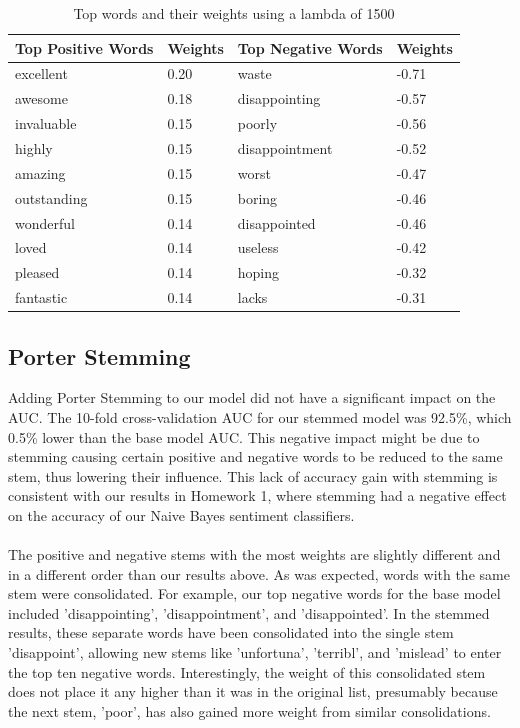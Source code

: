 \documentclass{article}
\begin{document}
\begin{table}[h]
    \begin{tabular}{|l|l|l|l|}
        \hline
        Top Positive Words & Weights & Top Negative Words & Weights \\ \hline
        excellent   & 0.20 & waste          & -0.71 \\ 
        awesome     & 0.18 & disappointing  & -0.57 \\ 
        invaluable  & 0.15 & poorly         & -0.56 \\ 
        highly      & 0.15 & disappointment & -0.52 \\ 
        amazing     & 0.15 & worst          & -0.47 \\ 
        outstanding & 0.15 & boring         & -0.46 \\ 
        wonderful   & 0.14 & disappointed   & -0.46 \\ 
        loved       & 0.14 & useless        & -0.42 \\ 
        pleased     & 0.14 & hoping         & -0.32 \\ 
        fantastic   & 0.14 & lacks          & -0.31 \\
        \hline
    \end{tabular}
    \caption{Top words and their weights using a lambda of 1500}
    \label{tab:words}
\end{table}


\subsection{Porter Stemming}

Adding Porter Stemming to our model did not have a significant impact on the AUC.  The 10-fold cross-validation AUC for our stemmed model was 92.5\%, which 0.5\% lower than the base model AUC. This negative impact might be due to stemming causing certain positive and negative words to be reduced to the same stem, thus lowering their influence. This lack of accuracy gain with stemming is consistent with our results in Homework 1, where stemming had a negative effect on the accuracy of our Naive Bayes sentiment classifiers.
\\\\The positive and negative stems with the most weights are slightly different and in a different order than our results above. As was expected, words with the same stem were consolidated. For example, our top negative words for the base model included 'disappointing', 'disappointment', and 'disappointed'. In the stemmed results, these separate words have been consolidated into the single stem 'disappoint', allowing new stems like 'unfortuna', 'terribl', and 'mislead' to enter the top ten negative words. Interestingly, the weight of this consolidated stem does not place it any higher than it was in the original list, presumably because the next stem, 'poor', has also gained more weight from similar consolidations.
\end{document}
